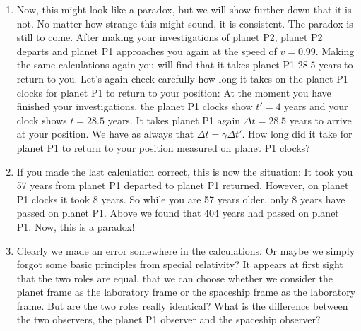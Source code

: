 {\begin{multicols}{2}
\begin{enumerate}
\item  Now, this might look like a paradox, but we will show further down that it is not. No matter how strange this might sound, it is consistent. The paradox is still to come. After making your investigations of planet P2, planet P2 departs and planet P1 approaches you again at the speed of $v=0.99$. Making the same calculations again you will find that it takes planet P1 $28.5$ years to return to you. Let's again check carefully how long it takes on the planet P1 clocks for planet P1 to return to your position: At the moment you  have finished your investigations, the planet P1 clocks show $t'=4$ years and your clock shows $t=28.5$ years. It takes planet P1 again $\Delta t=28.5$ years to arrive at your position. We have as always that $\Delta t=\gamma \Delta t'$. How long did it take for planet P1 to return to your position measured on planet P1 clocks?
\item If you made the last calculation correct, this is now the situation: It took you 57 years from planet P1 departed to planet P1 returned. However, on planet P1 clocks it took $8$ years. So while you are 57 years older, only $8$ years have passed on planet P1. Above we found that $404$ years had passed on planet P1. Now, this is a paradox!
\item Clearly we made an error somewhere in the calculations. Or maybe we simply forgot some basic principles from special relativity? It appears at first sight that the two roles are equal, that we can choose whether we consider the planet frame as the laboratory frame or the spaceship frame as the laboratory frame. But are the two roles really identical? What is the difference between the two observers, the planet P1 observer and the spaceship observer?

\end{enumerate}
\end{multicols}}
